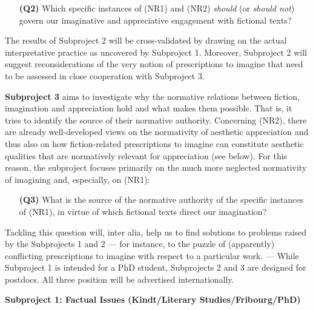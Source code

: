 \vspace{-.1cm}
\begin{itemize}[leftmargin=2cm]
\item[\textbf{(Q2)}] Which specific instances of (NR1) and (NR2) \emph{should} (or \emph{should not}) govern our imaginative and appreciative engagement with fictional texts?
\end{itemize}
\vspace{-.1cm}

\noindent The results of Subproject 2 will be cross-validated by drawing on the actual interpretative practice as uncovered by Subproject 1. Moreover, Subproject 2 will suggest reconsiderations of the very notion of prescriptions to imagine that need to be assessed in close cooperation with Subproject 3.

\vspace{.2cm}
\noindent\textbf{Subproject 3} aims to investigate why the normative relations between fiction, imagination and appreciation hold and what makes them possible. That is, it tries to identify the source of their normative authority. Concerning (NR2), there are already well-developed views on the normativity of aesthetic appreciation and thus also on how fiction-related prescriptions to imagine can constitute aesthetic qualities that are normatively relevant for appreciation (see below). For this reason, the subproject focuses primarily on the much more neglected normativity of imagining and, especially, on (NR1): 

\vspace{-.1cm}
\begin{itemize}[leftmargin=2cm]
\item[\textbf{(Q3)}] What is the source of the normative authority of the specific instances of (NR1), in virtue of which fictional texts direct our imagination?
\end{itemize}
\vspace{-.1cm}

\noindent Tackling this question will, inter alia, help us to find solutions to problems raised by the Subprojects 1 and 2 --- for instance, to the puzzle of (apparently) conflicting prescriptions to imagine with respect to a particular work. --- While Subproject 1 is intended for a PhD student, Subprojects 2 and 3 are designed for postdocs. All three position will be advertised internationally.

\vspace{.4cm}
\noindent\textbf{Subproject 1: Factual Issues (Kindt/Literary Studies/Fribourg/PhD)}
\vspace{.2cm}

